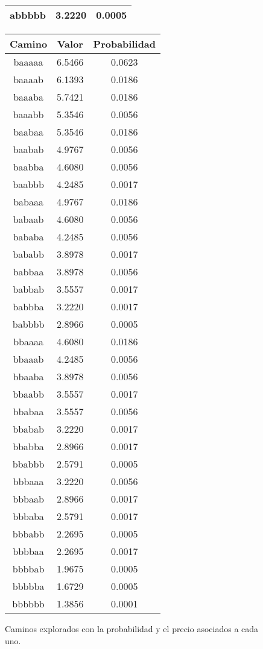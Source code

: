 \begin{figure}[hbpt]
\begin{minipage}{0.48\textwidth}
\begin{center}
\begin{tabular}{|c|c|c|}
abbbbb  &  3.2220  &  0.0005  \\
\hline
\end{tabular}
\end{center}
\end{minipage}
\begin{minipage}{0.48\textwidth}
\begin{center}
\begin{tabular}{|c|c|c|}
\hline
\textbf{Camino} & \textbf{Valor} & \textbf{Probabilidad} \\
\hline
baaaaa  &  6.5466  &  0.0623  \\
baaaab  &  6.1393  &  0.0186  \\
baaaba  &  5.7421  &  0.0186  \\
baaabb  &  5.3546  &  0.0056  \\
baabaa  &  5.3546  &  0.0186  \\
baabab  &  4.9767  &  0.0056  \\
baabba  &  4.6080  &  0.0056  \\
baabbb  &  4.2485  &  0.0017  \\
babaaa  &  4.9767  &  0.0186  \\
babaab  &  4.6080  &  0.0056  \\
bababa  &  4.2485  &  0.0056  \\
bababb  &  3.8978  &  0.0017  \\
babbaa  &  3.8978  &  0.0056  \\
babbab  &  3.5557  &  0.0017  \\
babbba  &  3.2220  &  0.0017  \\
babbbb  &  2.8966  &  0.0005  \\
bbaaaa  &  4.6080  &  0.0186  \\
bbaaab  &  4.2485  &  0.0056  \\
bbaaba  &  3.8978  &  0.0056  \\
bbaabb  &  3.5557  &  0.0017  \\
bbabaa  &  3.5557  &  0.0056  \\
bbabab  &  3.2220  &  0.0017  \\
bbabba  &  2.8966  &  0.0017  \\
bbabbb  &  2.5791  &  0.0005  \\
bbbaaa  &  3.2220  &  0.0056  \\
bbbaab  &  2.8966  &  0.0017  \\
bbbaba  &  2.5791  &  0.0017  \\
bbbabb  &  2.2695  &  0.0005  \\
bbbbaa  &  2.2695  &  0.0017  \\
bbbbab  &  1.9675  &  0.0005  \\
bbbbba  &  1.6729  &  0.0005  \\
bbbbbb  &  1.3856  &  0.0001  \\
\hline
\end{tabular}
\end{center}
\end{minipage}
\caption{Caminos explorados con la probabilidad y el precio asociados a cada uno.}
\label{fig:2_3b}
\end{figure}

